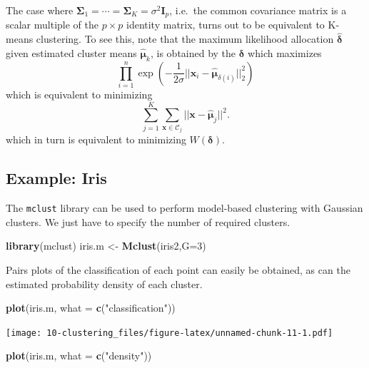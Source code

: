 \documentclass[
]{book}
\newenvironment{Shaded}{\begin{snugshade}}{\end{snugshade}}
\newcommand{\AttributeTok}[1]{\textcolor[rgb]{0.13,0.29,0.53}{#1}}
\newcommand{\DecValTok}[1]{\textcolor[rgb]{0.00,0.00,0.81}{#1}}
\newcommand{\FunctionTok}[1]{\textcolor[rgb]{0.13,0.29,0.53}{\textbf{#1}}}
\newcommand{\NormalTok}[1]{#1}
\newcommand{\OtherTok}[1]{\textcolor[rgb]{0.56,0.35,0.01}{#1}}
\newcommand{\StringTok}[1]{\textcolor[rgb]{0.31,0.60,0.02}{#1}}
\theoremstyle{definition}
\theoremstyle{definition}
\theoremstyle{definition}
\theoremstyle{definition}
\theoremstyle{remark}
\begin{document}
The case where \(\boldsymbol{\Sigma}_1=\cdots = \boldsymbol{\Sigma}_K=\sigma^2 \mathbf I_p\), i.e.~the common covariance matrix is a scalar multiple of the \(p \times p\) identity matrix, turns out to be equivalent to K-means clustering. To see this, note that the maximum likelihood allocation \(\hat{\boldsymbol \delta}\) given estimated cluster means \(\hat{{\boldsymbol{\mu}}}_k\), is obtained by the \(\boldsymbol \delta\) which maximizes
\[
\prod_{i=1}^n\exp(-\frac{1}{2\sigma}||\mathbf x_i-\hat{{\boldsymbol{\mu}}}_{\delta(i)}||_2^2)
\]
which is equivalent to minimizing
\[
\sum_{j=1}^K \sum_{\mathbf x\in \mathcal{C}_j} \vert \vert \mathbf x- \hat{{\boldsymbol{\mu}}}_j\vert \vert^2.
\]
which in turn is equivalent to minimizing \(W(\boldsymbol \delta)\).

\hypertarget{example-iris-1}{%
\subsection{Example: Iris}\label{example-iris-1}}

The \texttt{mclust} library can be used to perform model-based clustering with Gaussian clusters. We just have to specify the number of required clusters.

\begin{Shaded}
\begin{Highlighting}[]
\FunctionTok{library}\NormalTok{(mclust)}
\NormalTok{iris.m }\OtherTok{\textless{}{-}} \FunctionTok{Mclust}\NormalTok{(iris2,}\AttributeTok{G=}\DecValTok{3}\NormalTok{)}
\end{Highlighting}
\end{Shaded}

Pairs plots of the classification of each point can easily be obtained, as can the estimated probability density of each cluster.

\begin{Shaded}
\begin{Highlighting}[]
\FunctionTok{plot}\NormalTok{(iris.m, }\AttributeTok{what =} \FunctionTok{c}\NormalTok{(}\StringTok{"classification"}\NormalTok{))}
\end{Highlighting}
\end{Shaded}

\texttt{[image: 10-clustering\_files/figure-latex/unnamed-chunk-11-1.pdf]}

\begin{Shaded}
\begin{Highlighting}[]
\FunctionTok{plot}\NormalTok{(iris.m, }\AttributeTok{what =} \FunctionTok{c}\NormalTok{(}\StringTok{"density"}\NormalTok{))}
\end{Highlighting}
\end{Shaded}
\end{document}
